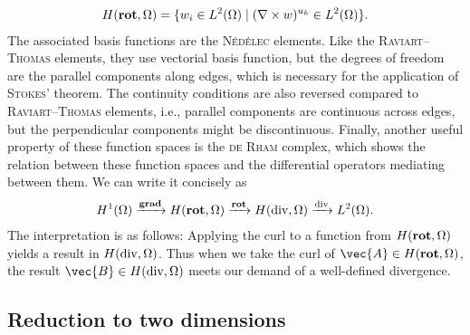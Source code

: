 \begin{gather}
  H (\operatorname{\mathbf{rot}}, \Omega) = \{ w_{i} \in L^{2} (\Omega) \; \vert \; (\nabla \times w)^{u_{k}} \in L^2 (\Omega) \}.
\end{gather}
The associated basis functions are the \textsc{Nédélec} elements. Like the \textsc{Raviart}--\textsc{Thomas} elements, they use vectorial basis function, but the degrees of freedom are the parallel components along edges, which is necessary for the application of \textsc{Stokes}' theorem. The continuity conditions are also reversed compared to \textsc{Raviart}--\textsc{Thomas} elements, i.e., parallel components are continuous across edges, but the perpendicular components might be discontinuous. Finally, another useful property of these function spaces is the \textsc{de Rham} complex, which shows the relation between these function spaces and the differential operators mediating between them. We can write it concisely as
\begin{gather}
  H^{1} (\Omega) \xrightarrow{\operatorname{\mathbf{grad}}} H (\operatorname{\mathbf{rot}}, \Omega) \xrightarrow{\operatorname{\mathbf{rot}}} H (\operatorname{div}, \Omega) \xrightarrow{\operatorname{div}} L^{2} (\Omega).
\end{gather}
The interpretation is as follows: Applying the curl to a function from $H (\operatorname{\mathbf{rot}}, \Omega)$ yields a result in $H (\operatorname{div}, \Omega)$. Thus when we take the curl of $\vec{A} \in H (\Curl, \Omega)$, the result $\vec{B} \in H (\Divg, \Omega)$ meets our demand of a well-defined divergence.

\subsection{Reduction to two dimensions}
\label{sec:fourier-fem}

